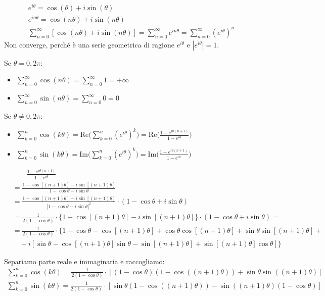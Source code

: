 \begin{gather*}
	e^{i\theta} = \cos(\theta) + i \sin(\theta) 
	\\	
	e^{in\theta} = \cos(n\theta) + i\sin(n\theta)
	\\	
	\sum_{n=0}^\infty [\cos(n\theta)+i\sin(n\theta)] = \sum_{n=0}^\infty e^{in\theta} =  \sum_{n=0}^\infty (e^{i\theta})^n
\end{gather*}
Non converge, perché è una serie geometrica di ragione $e^{i\theta}$ e $|e^{i\theta}| = 1$.

Se $\theta = 0, 2\pi$:
\begin{itemize}
	\item $\sum_{n=0}^\infty \cos(n\theta) = \sum_{n=0}^\infty 1 = +\infty$
	\item $\sum_{n=0}^\infty \sin(n\theta) = \sum_{n=0}^\infty 0 = 0$
\end{itemize}

Se $\theta \neq 0, 2\pi$:
\begin{itemize}
	\item $\sum_{k=0}^n \cos(k\theta) = \mathrm{Re} \bigg(\sum_{k=0}^n (e^{i\theta})^k \bigg) = \mathrm{Re} \bigg( \frac{1-e^{i\theta(n+1)}}{1-e^{i\theta}} \bigg)$
	\item $\sum_{k=0}^n \sin(k\theta) = \mathrm{Im} \bigg(\sum_{k=0}^n (e^{i\theta})^k \bigg) = \mathrm{Im} \bigg( \frac{1-e^{i\theta(n+1)}}{1-e^{i\theta}} \bigg)$
\end{itemize}

\begin{align*}
	& \qquad \frac{1-e^{i\theta(n+1)}}{1-e^{i\theta}} \\
	&= \frac{1 - \cos[(n+1)\theta] - i \sin[(n+1)\theta]}{1-\cos\theta - i \sin\theta} \\
	&= \frac{1 - \cos[(n+1)\theta] - i\sin[(n+1)\theta]}{|1-\cos\theta-i\sin\theta|^2} \cdot (1 - \cos\theta + i\sin\theta) \\
	&= \frac{1}{2(1-\cos\theta)} \cdot \{1 - \cos[(n+1)\theta] - i\sin[(n+1)\theta]\} \cdot (1 - \cos\theta + i\sin\theta)= \\
	&= \frac{1}{2(1-\cos\theta)} \cdot \{ 1 - \cos\theta - \cos[(n+1)\theta] + \cos\theta\cos[(n+1)\theta] + \sin\theta\sin[(n+1)\theta] + \\
	& \quad + i[\sin\theta-\cos[(n+1)\theta]\sin\theta - \sin[(n+1)\theta] + \sin[(n+1)\theta] \cos\theta ] \}
\end{align*}

Separiamo parte reale e immaginaria e raccogliamo:
\begin{gather*}
	\sum_{k=0}^n \cos(k\theta) =  \frac{1}{2(1-\cos\theta)} \cdot [(1-\cos\theta)(1-\cos((n+1)\theta)) + \sin\theta\sin((n+1)\theta)]
	\\
	\sum_{k=0}^n \sin(k\theta) =  \frac{1}{2(1-\cos\theta)} \cdot [\sin\theta(1-\cos((n+1)\theta)) - \sin((n+1)\theta)(1-\cos\theta)]
\end{gather*}	
	
